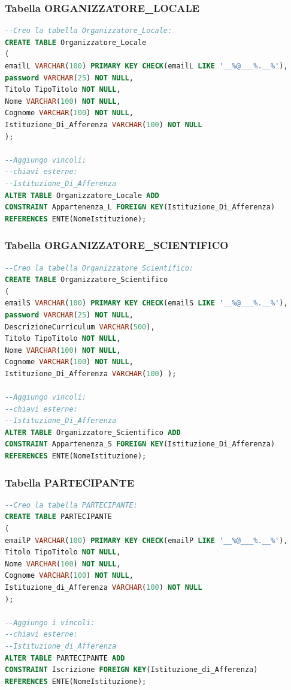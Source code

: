 \documentclass[a4page]{article}
\begin{document}
\subsubsection{Tabella ORGANIZZATORE\_LOCALE}
\begin{lstlisting}[language=SQL,
        deletekeywords={IDENTITY,INT},
        morekeywords={clustered},    
        framesep=10pt,
        framextopmargin=10pt]
--Creo la tabella Organizzatore_Locale: 
CREATE TABLE Organizzatore_Locale
(
emailL VARCHAR(100) PRIMARY KEY CHECK(emailL LIKE '__%@___%.__%'),
password VARCHAR(25) NOT NULL,
Titolo TipoTitolo NOT NULL,
Nome VARCHAR(100) NOT NULL,
Cognome VARCHAR(100) NOT NULL,
Istituzione_Di_Afferenza VARCHAR(100) NOT NULL          
);

--Aggiungo vincoli:
--chiavi esterne:
--Istituzione_Di_Afferenza
ALTER TABLE Organizzatore_Locale ADD
CONSTRAINT Appartenenza_L FOREIGN KEY(Istituzione_Di_Afferenza)
REFERENCES ENTE(NomeIstituzione);        

\end{lstlisting}
\subsubsection{Tabella ORGANIZZATORE\_SCIENTIFICO}
\begin{lstlisting}[language=SQL,
        deletekeywords={IDENTITY,INT},
        morekeywords={clustered},    
        framesep=10pt,
        framextopmargin=10pt]
--Creo la tabella Organizzatore_Scientifico: 
CREATE TABLE Organizzatore_Scientifico
(
emailS VARCHAR(100) PRIMARY KEY CHECK(emailS LIKE '__%@___%.__%'),
password VARCHAR(25) NOT NULL,
DescrizioneCurriculum VARCHAR(500),
Titolo TipoTitolo NOT NULL,
Nome VARCHAR(100) NOT NULL,
Cognome VARCHAR(100) NOT NULL,
Istituzione_Di_Afferenza VARCHAR(100) );

--Aggiungo vincoli:
--chiavi esterne:
--Istituzione_Di_Afferenza
ALTER TABLE Organizzatore_Scientifico ADD
CONSTRAINT Appartenenza_S FOREIGN KEY(Istituzione_Di_Afferenza)
REFERENCES ENTE(NomeIstituzione);        

\end{lstlisting}

\subsubsection{Tabella PARTECIPANTE}
\begin{lstlisting}[language=SQL,
        deletekeywords={IDENTITY,INT},
        morekeywords={clustered},    
        framesep=10pt,
        framextopmargin=10pt]
--Creo la tabella PARTECIPANTE: 
CREATE TABLE PARTECIPANTE
(
emailP VARCHAR(100) PRIMARY KEY CHECK(emailP LIKE '__%@___%.__%'),
Titolo TipoTitolo NOT NULL,
Nome VARCHAR(100) NOT NULL,
Cognome VARCHAR(100) NOT NULL,
Istituzione_di_Afferenza VARCHAR(100) NOT NULL
);

--Aggiungo i vincoli:
--chiavi esterne:
--Istituzione_di_Afferenza
ALTER TABLE PARTECIPANTE ADD
CONSTRAINT Iscrizione FOREIGN KEY(Istituzione_di_Afferenza)
REFERENCES ENTE(NomeIstituzione);        

\end{lstlisting}
\end{document}
